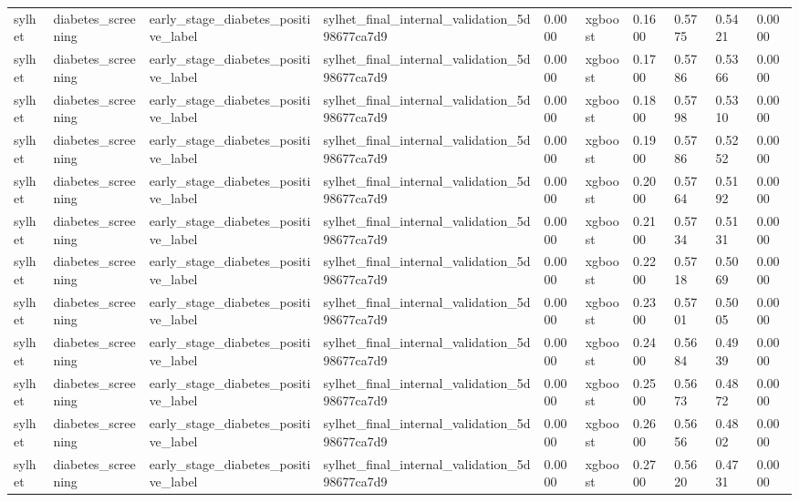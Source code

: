 \begin{tabular}{llllllllll}
sylhet & diabetes\_screening & early\_stage\_diabetes\_positive\_label & sylhet\_final\_internal\_validation\_5d98677ca7d9 & 0.0000 & xgboost & 0.1600 & 0.5775 & 0.5421 & 0.0000 \\
sylhet & diabetes\_screening & early\_stage\_diabetes\_positive\_label & sylhet\_final\_internal\_validation\_5d98677ca7d9 & 0.0000 & xgboost & 0.1700 & 0.5786 & 0.5366 & 0.0000 \\
sylhet & diabetes\_screening & early\_stage\_diabetes\_positive\_label & sylhet\_final\_internal\_validation\_5d98677ca7d9 & 0.0000 & xgboost & 0.1800 & 0.5798 & 0.5310 & 0.0000 \\
sylhet & diabetes\_screening & early\_stage\_diabetes\_positive\_label & sylhet\_final\_internal\_validation\_5d98677ca7d9 & 0.0000 & xgboost & 0.1900 & 0.5786 & 0.5252 & 0.0000 \\
sylhet & diabetes\_screening & early\_stage\_diabetes\_positive\_label & sylhet\_final\_internal\_validation\_5d98677ca7d9 & 0.0000 & xgboost & 0.2000 & 0.5764 & 0.5192 & 0.0000 \\
sylhet & diabetes\_screening & early\_stage\_diabetes\_positive\_label & sylhet\_final\_internal\_validation\_5d98677ca7d9 & 0.0000 & xgboost & 0.2100 & 0.5734 & 0.5131 & 0.0000 \\
sylhet & diabetes\_screening & early\_stage\_diabetes\_positive\_label & sylhet\_final\_internal\_validation\_5d98677ca7d9 & 0.0000 & xgboost & 0.2200 & 0.5718 & 0.5069 & 0.0000 \\
sylhet & diabetes\_screening & early\_stage\_diabetes\_positive\_label & sylhet\_final\_internal\_validation\_5d98677ca7d9 & 0.0000 & xgboost & 0.2300 & 0.5701 & 0.5005 & 0.0000 \\
sylhet & diabetes\_screening & early\_stage\_diabetes\_positive\_label & sylhet\_final\_internal\_validation\_5d98677ca7d9 & 0.0000 & xgboost & 0.2400 & 0.5684 & 0.4939 & 0.0000 \\
sylhet & diabetes\_screening & early\_stage\_diabetes\_positive\_label & sylhet\_final\_internal\_validation\_5d98677ca7d9 & 0.0000 & xgboost & 0.2500 & 0.5673 & 0.4872 & 0.0000 \\
sylhet & diabetes\_screening & early\_stage\_diabetes\_positive\_label & sylhet\_final\_internal\_validation\_5d98677ca7d9 & 0.0000 & xgboost & 0.2600 & 0.5656 & 0.4802 & 0.0000 \\
sylhet & diabetes\_screening & early\_stage\_diabetes\_positive\_label & sylhet\_final\_internal\_validation\_5d98677ca7d9 & 0.0000 & xgboost & 0.2700 & 0.5620 & 0.4731 & 0.0000 \\

\end{tabular}
